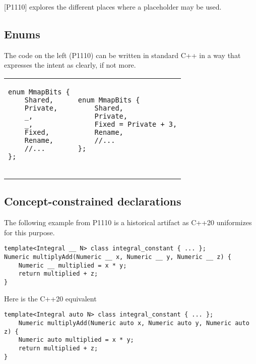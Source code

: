 \documentclass{wg21}
\begin{document}
{[P1110] explores the different places where a placeholder may be used.


\subsection{Enums}

The code on the left (P1110) can be written in standard C++ in a way that expresses the intent as clearly, if not more. 

\begin{center}
\begin{tabular}{l|l}
\begin{minipage}[t]{0.5\textwidth}
\begin{lstlisting}[style=color]
enum MmapBits {
    Shared,
    Private,
    _,
    _,
    Fixed,
    Rename,
    //...
};
    
\end{lstlisting}
\end{minipage}
&
\begin{minipage}[t]{0.5\textwidth}
\begin{lstlisting}[style=color]
enum MmapBits {
    Shared,
    Private,
    Fixed = Private + 3,
    Rename,
    //...
};
    
\end{lstlisting}
\end{minipage}
\end{tabular}
\end{center}

\subsection{Concept-constrained declarations}

The following example from P1110 is a historical artifact as C++20 uniformizes  for this purpose. 

\begin{lstlisting}[style=color]
template<Integral __ N> class integral_constant { ... };
Numeric multiplyAdd(Numeric __ x, Numeric __ y, Numeric __ z) {
    Numeric __ multiplied = x * y;
    return multiplied + z;
}
\end{lstlisting}

Here is the C++20 equivalent

\begin{lstlisting}[style=color]
template<Integral auto N> class integral_constant { ... };
    Numeric multiplyAdd(Numeric auto x, Numeric auto y, Numeric auto z) {
    Numeric auto multiplied = x * y;
    return multiplied + z;
}
\end{lstlisting}


}
\end{document}
